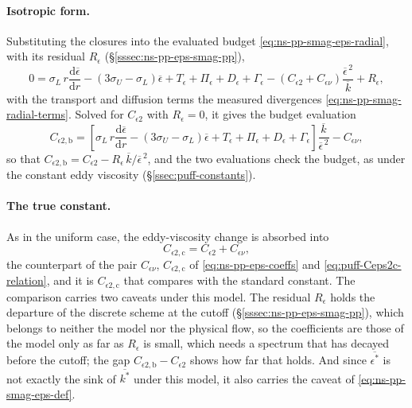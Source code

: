 \documentclass{article}
\begin{document}
\paragraph{Isotropic form.}
Substituting the closures into the evaluated budget
\eqref{eq:ns-pp-smag-eps-radial}, with its residual $R_\epsilon$
(\S\ref{sssec:ns-pp-eps-smag-pp}),
\begin{equation}\label{eq:ns-pp-smag-model-stationary}
  0 = \sigma_L\, r \frac{\mathrm{d} \overline{\epsilon}}{\mathrm{d} r}
  - \left( 3\sigma_U - \sigma_L \right) \overline{\epsilon}
  + T_\epsilon + \Pi_\epsilon + D_\epsilon + \Gamma_\epsilon
  - \left( C_{\epsilon 2} + C_{\epsilon\nu} \right) \frac{\overline{\epsilon}^{\,2}}{\overline{k}}
  + R_\epsilon ,
\end{equation}
with the transport and diffusion terms the measured divergences
\eqref{eq:ns-pp-smag-radial-terms}. Solved for $C_{\epsilon 2}$ with
$R_\epsilon = 0$, it gives the budget evaluation
\begin{equation}\label{eq:ns-pp-smag-Ceps2-budget}
  C_{\epsilon 2,\mathrm{b}}
  = \left[ \sigma_L\, r \frac{\mathrm{d} \overline{\epsilon}}{\mathrm{d} r}
  - \left( 3\sigma_U - \sigma_L \right) \overline{\epsilon}
  + T_\epsilon + \Pi_\epsilon + D_\epsilon + \Gamma_\epsilon \right]
  \frac{\overline{k}}{\overline{\epsilon}^{\,2}}
  - C_{\epsilon\nu} ,
\end{equation}
so that
$C_{\epsilon 2,\mathrm{b}} = C_{\epsilon 2} - R_\epsilon\, \overline{k}/\overline{\epsilon}^{\,2}$,
and the two evaluations check the budget, as under the constant eddy
viscosity (\S\ref{ssec:puff-constants}).

\paragraph{The true constant.}
As in the uniform case, the eddy-viscosity change is absorbed into
\begin{equation}\label{eq:ns-pp-smag-Cnu}
  C_{\epsilon 2,\mathrm{c}} = C_{\epsilon 2} + C_{\epsilon\nu} ,
\end{equation}
the counterpart of the pair $C_{\epsilon\nu}$, $C_{\epsilon 2,\mathrm{c}}$ of
\eqref{eq:ns-pp-eps-coeffs} and \eqref{eq:puff-Ceps2c-relation}, and it is
$C_{\epsilon 2,\mathrm{c}}$ that compares with the standard constant. The
comparison carries two caveats under this model. The residual $R_\epsilon$
holds the departure of the discrete scheme at the cutoff
(\S\ref{sssec:ns-pp-eps-smag-pp}), which belongs to neither the model nor the
physical flow, so the coefficients are those of the model only as far as
$R_\epsilon$ is small, which needs a spectrum that has decayed before the
cutoff; the gap $C_{\epsilon 2,\mathrm{b}} - C_{\epsilon 2}$ shows how far that
holds. And since $\overline{\epsilon^*}$ is not exactly the sink of
$\overline{k^*}$ under this model, it also carries the caveat of
\eqref{eq:ns-pp-smag-eps-def}.
\end{document}
